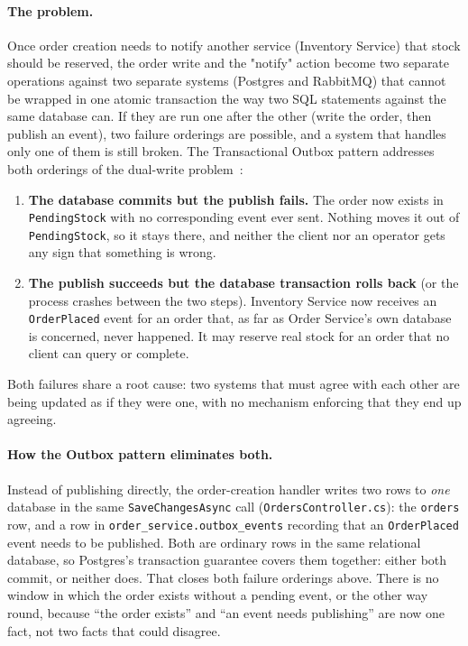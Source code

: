 \documentclass[a4paper]{report}
\begin{document}
\paragraph{The problem.} Once order creation needs to notify another service
(Inventory Service) that stock should be reserved, the order write
and the "notify" action become two separate operations against two separate
systems (Postgres and RabbitMQ) that cannot be wrapped in one atomic
transaction the way two SQL statements against the same database can. If
they are run one after the other (write the order, then publish an
event), two failure orderings are possible, and a system that handles only
one of them is still broken. The Transactional Outbox pattern addresses both
orderings of the dual-write
problem~\cite{richardson-outbox,richardson-patterns}:

\begin{enumerate}
  \item \textbf{The database commits but the publish fails.} The order now
    exists in \texttt{PendingStock} with no corresponding event ever sent.
    Nothing moves it out of \texttt{PendingStock}, so it stays there, and
    neither the client nor an operator gets any sign that something is
    wrong.
  \item \textbf{The publish succeeds but the database transaction rolls
    back} (or the process crashes between the two steps). Inventory Service
    now receives an \texttt{OrderPlaced} event for an order that, as far as
    Order Service's own database is concerned, never happened. It may
    reserve real stock for an order that no client can query or complete.
\end{enumerate}

Both failures share a root cause: two systems that must agree with each
other are being updated as if they were one, with no mechanism enforcing
that they end up agreeing.

\paragraph{How the Outbox pattern eliminates both.} Instead of publishing
directly, the order-creation handler writes two rows to \emph{one}
database in the same \texttt{SaveChangesAsync} call
(\texttt{OrdersController.cs}): the
\texttt{orders} row, and a row in \texttt{order\_service.outbox\_events}
recording that an \texttt{OrderPlaced} event needs to be published. Both are
ordinary rows in the same relational database, so Postgres's transaction
guarantee covers them together: either both commit, or neither does. That
closes both failure orderings above. There is no window in which the order
exists without a pending event, or the other way round, because ``the order
exists'' and ``an event needs publishing'' are now one fact, not two facts
that could disagree.
\end{document}
